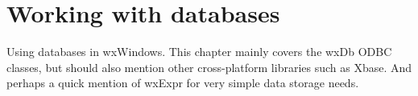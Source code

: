 \chapter{Working with databases}\label{chapdatabase}
%
%
\setfooter{\thepage}{}{}{}{}{\thepage}%

Using databases in wxWindows. This chapter mainly covers the wxDb ODBC classes, but should also
mention other cross-platform libraries such as Xbase. And perhaps a quick mention of wxExpr for very simple
data storage needs.


